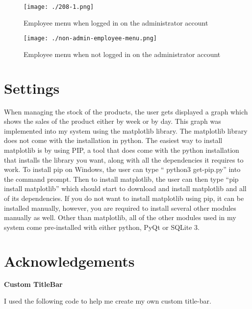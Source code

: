 \begin{figure}[H]
\caption{Employee menu when logged in on the administrator account} \label{fig:admin-employee-menu}
\texttt{[image: ./208-1.png]}
\end{figure}


\begin{figure}[H]
\caption{Employee menu when not logged in on the administrator account} \label{fig:non-admin-employee-menu}
\texttt{[image: ./non-admin-employee-menu.png]}
\end{figure}





\section{Settings}

When managing the stock of the products, the user gets displayed a graph which shows the sales of the product either by week or by day. This graph was implemented into my system using the matplotlib library. The matplotlib library does not come with the installation in python. The easiest way to install matplotlib is by using PIP, a tool that does come with the python installation that installs the library you want, along with all the dependencies it requires to work. To install pip on Windows, the user can type `` python3 get-pip.py'' into the command prompt. Then to install matplotlib, the user can then type ``pip install matplotlib'' which should start to download and install matplotlib and all of its dependencies. If you do not want to install matplotlib using pip, it can be installed manually, however, you are required to install several other modules manually as well. Other than matplotlib, all of the other modules used in my system come pre-installed with either python, PyQt or SQLite 3.

\section{Acknowledgements}

\textbf{Custom TitleBar}


I used the following code to help me create my own custom title-bar.

